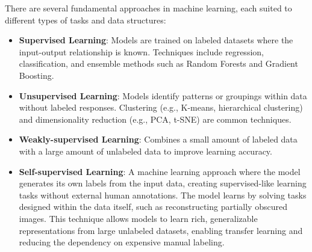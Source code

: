 \documentclass[12pt,a4paper,oneside]{report}
\begin{document}
There are several fundamental approaches in machine learning, each suited to different 
types of tasks and data structures:

\begin{itemize}
    \item \textbf{Supervised Learning}: Models are trained on labeled datasets where 
    the input-output relationship is known. Techniques include regression, classification, 
    and ensemble methods such as Random Forests and Gradient Boosting.
    \item \textbf{Unsupervised Learning}: Models identify patterns or groupings within 
    data without labeled responses. Clustering (e.g., K-means, hierarchical clustering) 
    and dimensionality reduction (e.g., PCA, t-SNE) are common techniques.
    \item \textbf{Weakly-supervised Learning}: Combines a small amount of labeled data with 
    a large amount of unlabeled data to improve learning accuracy.
    \item \textbf{Self-supervised Learning}: A machine learning approach where the model
    generates its own labels from the input data, creating supervised-like learning
    tasks without external human annotations. The model learns by solving tasks
    designed within the data itself, such as
    reconstructing partially obscured images. This technique allows models to learn rich, generalizable
    representations from large unlabeled datasets, enabling transfer learning and
    reducing the dependency on expensive manual labeling.
\end{itemize}
\end{document}
